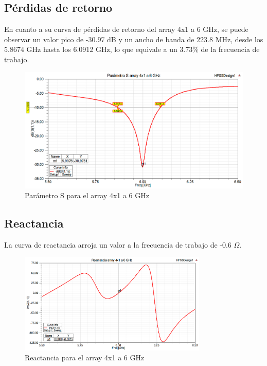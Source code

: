 \subsection{Pérdidas de retorno}
\par En cuanto a su curva de pérdidas de retorno del array 4x1 a 6 GHz, se puede observar un valor pico de -30.97 dB y un ancho de banda de 223.8 MHz, desde los 5.8674 GHz hasta los 6.0912 GHz, lo que equivale a un 3.73\% de la frecuencia de trabajo.
\\
\begin{figure}[H]
    \centering
        \includegraphics[width=\textwidth]{archivos/analisis/4x12/1}
        \caption{Parámetro S para el array 4x1 a 6 GHz}
        \label{fig:s4x12}
\end{figure}

\newpage
\subsection{Reactancia}
\par La curva de reactancia arroja un valor a la frecuencia de trabajo de -0.6 $\Omega$. 
\\
\begin{figure}[H]
    \centering
        \includegraphics[width=0.8\textwidth]{archivos/analisis/4x12/2}
        \caption{Reactancia para el array 4x1 a 6 GHz}
        \label{fig:react4x12}
\end{figure}

